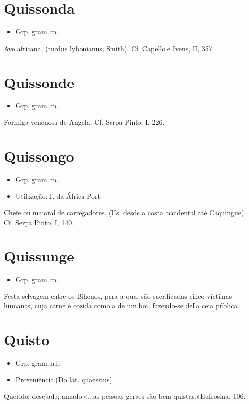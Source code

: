 \section{Quissonda}
\begin{itemize}
\item {Grp. gram.:m.}
\end{itemize}
Ave africana, (\textunderscore turdus lybonianus\textunderscore , Smith). Cf. Capello e Ivens, II, 357.
\section{Quissonde}
\begin{itemize}
\item {Grp. gram.:m.}
\end{itemize}
Formiga venenosa de Angola. Cf. Serpa Pinto, I, 226.
\section{Quissongo}
\begin{itemize}
\item {Grp. gram.:m.}
\end{itemize}
\begin{itemize}
\item {Utilização:T. da África Port}
\end{itemize}
Chefe ou maioral de carregadores. (Us. desde a costa occidental até Caquingue) Cf. Serpa Pinto, I, 140.
\section{Quissunge}
\begin{itemize}
\item {Grp. gram.:m.}
\end{itemize}
Festa selvagem entre os Bihenos, para a qual são sacrificadas cinco víctimas humanas, cuja carne é cozida como a de um boi, fazendo-se della ceia pública.
\section{Quisto}
\begin{itemize}
\item {Grp. gram.:adj.}
\end{itemize}
\begin{itemize}
\item {Proveniência:(Do lat. \textunderscore quaesitus\textunderscore )}
\end{itemize}
Querido; desejado; amado:«\textunderscore ...as pessoas geraes são bem quistas.\textunderscore »\textunderscore Eufrosina\textunderscore , 106.
